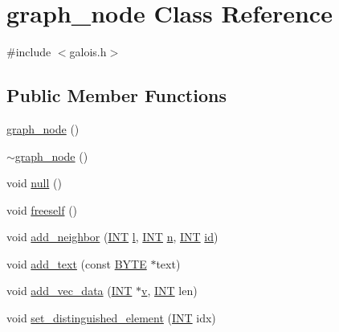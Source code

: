 \hypertarget{classgraph__node}{}\section{graph\+\_\+node Class Reference}
\label{classgraph__node}


{\ttfamily \#include $<$galois.\+h$>$}

\subsection*{Public Member Functions}
\begin{DoxyCompactItemize}
\item 
\mbox{\hyperlink{classgraph__node_a1251fd3bbee5992d47fc11afad3834af}{graph\+\_\+node}} ()
\item 
\mbox{\hyperlink{classgraph__node_a178c213234761b36f337a5fc2e2d1305}{$\sim$graph\+\_\+node}} ()
\item 
void \mbox{\hyperlink{classgraph__node_a1c367f072f259d75c5debb41011e7328}{null}} ()
\item 
void \mbox{\hyperlink{classgraph__node_a7ac4fec7e174284d17f9d43e2ab5f5b1}{freeself}} ()
\item 
void \mbox{\hyperlink{classgraph__node_a22cf1ed1de6059f37be3e8f778cbba09}{add\+\_\+neighbor}} (\mbox{\hyperlink{galois_8h_a09fddde158a3a20bd2dcadb609de11dc}{I\+NT}} \mbox{\hyperlink{alphabet2_8_c_a89606eca6b563ec68d2da2e84657736f}{l}}, \mbox{\hyperlink{galois_8h_a09fddde158a3a20bd2dcadb609de11dc}{I\+NT}} \mbox{\hyperlink{simeon_8_c_a7f2cd26777ce0ff3fdaf8d02aacbddfb}{n}}, \mbox{\hyperlink{galois_8h_a09fddde158a3a20bd2dcadb609de11dc}{I\+NT}} \mbox{\hyperlink{classgraph__node_ae48905cdfc74fdccb1102b6b60c086b8}{id}})
\item 
void \mbox{\hyperlink{classgraph__node_af21adc4e54d53c060db9470669ca8e3f}{add\+\_\+text}} (const \mbox{\hyperlink{galois_8h_ab6cc7b4aeb6ea31aba2b3fbfc83ff5e6}{B\+Y\+TE}} $\ast$text)
\item 
void \mbox{\hyperlink{classgraph__node_a782ccbf13765e1c11d28da219f668d32}{add\+\_\+vec\+\_\+data}} (\mbox{\hyperlink{galois_8h_a09fddde158a3a20bd2dcadb609de11dc}{I\+NT}} $\ast$\mbox{\hyperlink{simeon_8_c_aeb3f3030944801b163bc3b829a7f6710}{v}}, \mbox{\hyperlink{galois_8h_a09fddde158a3a20bd2dcadb609de11dc}{I\+NT}} len)
\item 
void \mbox{\hyperlink{classgraph__node_ae014feef00457e1cc7620b76da08df8a}{set\+\_\+distinguished\+\_\+element}} (\mbox{\hyperlink{galois_8h_a09fddde158a3a20bd2dcadb609de11dc}{I\+NT}} idx)

\end{DoxyCompactItemize}
